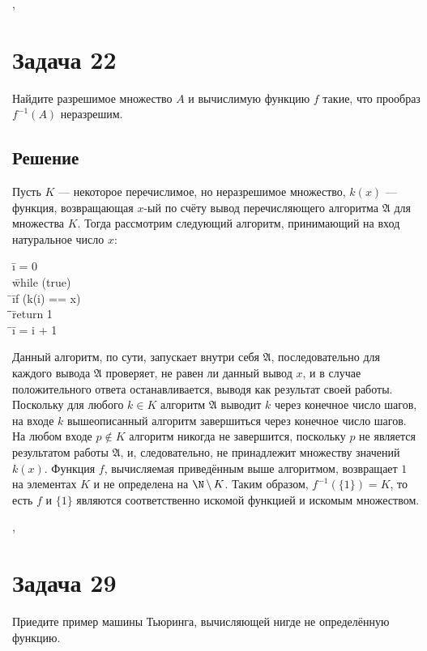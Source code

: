 \documentclass[a4paper,12pt]{article}
\newcommand {\gu} [1] {\guillemotleft#1\guillemotright}
\newcommand{\tab}{\quad\=}
\newenvironment{programm}{
    \ttfamily
    \smallskip
    \begin{tabbing}
    }
    {
    \end{tabbing}
    \smallskip
}
\begin{document}
	\sep
	
	\section*{Задача 22}
	Найдите разрешимое множество $A$ и вычислимую функцию $f$ такие, что прообраз $f^{-1}(A)$ неразрешим.
	\subsection*{Решение}
	Пусть $K$ --- некоторое перечислимое, но неразрешимое множество, $k(x)$ --- функция, возвращающая $x$-ый по счёту вывод перечисляющего алгоритма $\mathfrak{A}$ для множества $K$. Тогда рассмотрим следующий алгоритм, принимающий на вход натуральное число $x$:
	\begin{programm}
	\tab i = 0\\
	\tab while (true)\\
	\tab \tab if (k(i) == x)\\
	\tab \tab \tab return 1\\
	\tab \tab i = i + 1\\
	\end{programm}
	
	Данный алгоритм, по сути, запускает внутри себя $\mathfrak{A}$, последовательно для каждого вывода $\mathfrak{A}$ проверяет, не равен ли данный вывод $x$, и в случае положительного ответа останавливается, выводя \gu{1} как результат своей работы. Поскольку для любого $k\in K$ алгоритм $\mathfrak{A}$ выводит $k$ через конечное число шагов, на входе $k$ вышеописанный алгоритм завершиться через конечное число шагов. На любом входе $p\not\in K$ алгоритм никогда не завершится, поскольку $p$ не является результатом работы $\mathfrak{A}$, и, следовательно, не принадлежит множеству значений $k(x)$. Функция $f$, вычисляемая приведённым выше алгоритмом, возвращает $1$ на элементах $K$ и не определена на $\N\,\backslash\,K$. Таким образом, $f^{-1}(\{1\})=K$, то есть $f$ и $\{1\}$ являются соответственно искомой функцией и искомым множеством.
	
	\sep
	
	\section*{Задача 29}
	Приедите пример машины Тьюринга, вычисляющей нигде не определённую функцию.
\end{document}
